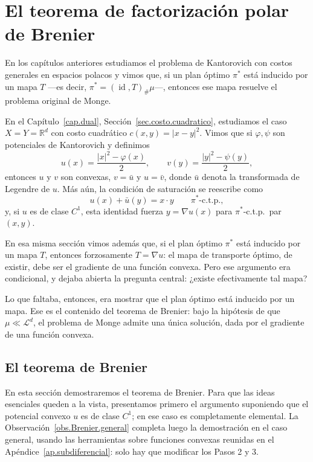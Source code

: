 \documentclass[12pt, a4paper]{amsbook}
\newcommand{\id}{\operatorname{id}}
\newcommand{\R}{{\mathbb R}}
\theoremstyle{remark}
\theoremstyle{definition}
\numberwithin{section}{chapter}
\numberwithin{subsection}{section}
\numberwithin{equation}{section}
\numberwithin{figure}{chapter}
\begin{document}
\chapter{El teorema de factorización polar de Brenier}\label{cap.Brenier}

En los capítulos anteriores estudiamos el problema de Kantorovich con costos
generales en espacios polacos y vimos que, si un plan óptimo $\pi^*$ está
inducido por un mapa $T$ —es decir, $\pi^*=(\id,T)_\#\mu$—, entonces ese mapa
resuelve el problema original de Monge.

En el Capítulo~\ref{cap.dual}, Sección~\ref{sec.costo.cuadratico}, estudiamos
el caso $X=Y=\R^d$ con costo cuadrático $c(x,y)=|x-y|^2$. Vimos que si
$\varphi,\psi$ son potenciales de Kantorovich y definimos
\[
u(x)=\frac{|x|^2-\varphi(x)}{2},
\qquad
v(y)=\frac{|y|^2-\psi(y)}{2},
\]
entonces $u$ y $v$ son convexas, $v=\bar u$ y $u=\bar v$, donde $\bar u$
denota la transformada de Legendre de $u$. Más aún, la condición de
saturación se reescribe como
\[
u(x)+\bar u(y)=x\cdot y
\qquad
\pi^*\text{-c.t.p.},
\]
y, si $u$ es de clase $C^1$, esta identidad fuerza $y=\nabla u(x)$ para
$\pi^*$-c.t.p.\ par $(x,y)$.

En esa misma sección vimos además que, si el plan óptimo $\pi^*$ está inducido
por un mapa $T$, entonces forzosamente $T=\nabla u$: el mapa de transporte
óptimo, de existir, debe ser el gradiente de una función convexa. Pero ese
argumento era condicional, y dejaba abierta la pregunta central: ¿existe
efectivamente tal mapa?

Lo que faltaba, entonces, era mostrar que el plan óptimo está inducido por un
mapa. Ese es el contenido del teorema de Brenier: bajo la hipótesis de que
$\mu\ll\mathcal L^d$, el problema de Monge admite una única solución, dada por
el gradiente de una función convexa.


\section{El teorema de Brenier}\label{sec.Brenier}

En esta sección demostraremos el teorema de Brenier. Para que las ideas
esenciales queden a la vista, presentamos primero el argumento suponiendo que
el potencial convexo $u$ es de clase $C^1$; en ese caso es completamente
elemental. La Observación~\ref{obs.Brenier.general} completa luego la
demostración en el caso general, usando las herramientas sobre funciones
convexas reunidas en el Apéndice~\ref{ap.subdiferencial}: solo hay que
modificar los Pasos 2 y 3.
\end{document}
